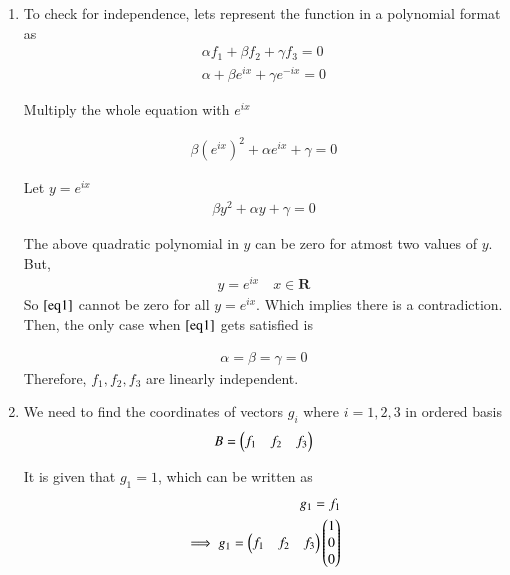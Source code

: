 \documentclass[journal,12pt,twocolumn]{IEEEtran}
\begin{document}
	\begin{enumerate}[label=(\alph*)]
		\item To check for independence, lets represent the function in a polynomial format as \\
		
		\begin{align}
			\alpha f_1 + \beta f_2 + \gamma f_3 = 0\\
			\alpha + \beta e^{ix} + \gamma e^{-ix} = 0 
		\end{align}
		
		Multiply the whole equation with $e^{ix}$ 
		
		\begin{align}
			\beta (e^{ix})^{2} + \alpha e^{ix} + \gamma = 0
		\end{align}
		
		Let $y = e^{ix}$
		\begin{align}
			\beta y^{2} + \alpha y + \gamma = 0 \label{eq1}
		\end{align}
		
		The above quadratic polynomial in $y$ can be zero for atmost two values of $y$. But, 
		\begin{align}
			y = e^{ix} \quad x \in \mathbf{R}
		\end{align}
		So $\eqref{eq1}$ cannot be zero for all $y = e^{ix}$. Which implies there is a contradiction. \\
		
		Then, the only case when $\eqref{eq1}$ gets satisfied is
		
		\begin{align}
			\alpha = \beta = \gamma = 0
		\end{align}
		Therefore, $f_1, f_2, f_3$ are linearly independent. \\
		
		\item We need to find the coordinates of vectors $g_i$ where $i = 1, 2, 3$ in ordered basis
		\begin{align}
			B = \begin{pmatrix}f_1 & f_2 & f_3\end{pmatrix} \label{eq5}
		\end{align}
		
		It is given that $g_1 = 1$, which can be written as 
		\begin{align}
			g_1 = f_1 \label{eq4}   \\ 
			\implies g_1 = \begin{pmatrix}f_1 & f_2 & f_3\end{pmatrix}\begin{pmatrix}1\\0\\0\end{pmatrix}
		\end{align}
		

\end{enumerate}
\end{document}
